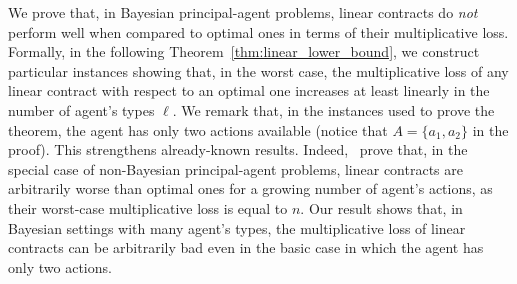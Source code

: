 We prove that, in Bayesian principal-agent problems, linear contracts do \emph{not} perform well when compared to optimal ones in terms of their multiplicative loss.
%
Formally, in the following Theorem~\ref{thm:linear_lower_bound}, we construct particular instances showing that, in the worst case, the multiplicative loss of any linear contract with respect to an optimal one increases at least linearly in the number of agent's types $\ell$.
% 
%
We remark that, in the instances used to prove the theorem, the agent has only two actions available (notice that $A = \{ a_1, a_2 \}$ in the proof).
%
This strengthens already-known results.
%
Indeed,~\citet{dutting2019simple} prove that, in the special case of non-Bayesian principal-agent problems, linear contracts are arbitrarily worse than optimal ones for a growing number of agent's actions, as their worst-case multiplicative loss is equal to $n$.
%
Our result shows that, in Bayesian settings with many agent's types, the multiplicative loss of linear contracts can be arbitrarily bad even in the basic case in which the agent has only two actions. 
%



